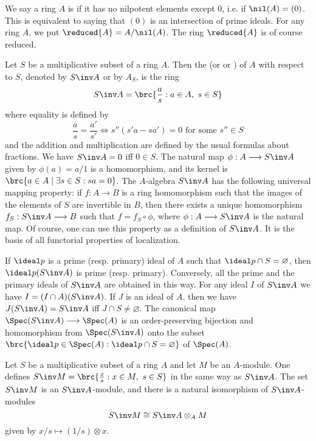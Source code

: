 \documentclass[../main]{subfiles}
\begin{document}
We say a ring $A$ is  if it has no nilpotent elements except 0, i.e. if $\nil(A)=(0)$. This is equivalent to saying that $(0)$ is an intersection of prime ideals. For any ring $A$, we put $\reduced{A}=A/\nil(A)$. The ring $\reduced{A}$ is of course reduced.

\newparagraph
Let $S$ be a multiplicative subset of a ring $A$. Then the  (or  or ) of $A$ with respect to $S$, denoted by $S\inv A$ or by $A_S$, is the ring
\[S\inv A = \brc{\frac as: a\in A,~s\in S}\]
where equality is defined by
\[\frac as = \frac{a'}{s'}
\iff s''(s'a-sa') = 0 \text{ for some }s''\in S\]
and the addition and multiplication are defined by the usual formulas about fractions. We have $S\inv A=0$ iff $0\in S$. The natural map $\phi:A\longrightarrow S\inv A$ given by $\phi(a)=a/1$ is a homomorphism, and its kernel is $\brc{a\in A\mid \exists s\in S: sa=0}$. The $A$-algebra $S\inv A$ has the following universal mapping property: if $f:A\longrightarrow B$ is a ring homomorphism such that the images of the elements of $S$ are invertible in $B$, then there exists a unique homomorphism $f_S:S\inv A\longrightarrow B$ such that $f=f_S\circ\phi$, where $\phi:A\longrightarrow S\inv A$ is the natural map. Of course, one can use this property as a definition of $S\inv A$. It is the basis of all functorial properties of localization.

If $\ideal p$ is a prime (resp. primary) ideal of $A$ such that $\ideal p\cap S=\varnothing$, then $\ideal p(S\inv A)$ is prime (resp. primary). Conversely, all the prime and the primary ideals of $S\inv A$ are obtained in this way. For any ideal $I$ of $S\inv A$ we have $I=(I\cap A)(S\inv A)$. If $J$ is an ideal of $A$, then we have $J(S\inv A)=S\inv A$ iff $J\cap S\ne\varnothing$. The canonical map $\Spec(S\inv A)\longrightarrow\Spec(A)$ is an order-preserving bijection and homomorphism from $\Spec(S\inv A)$ onto the subset $\brc{\ideal p\in\Spec(A): \ideal p\cap S=\varnothing}$ of $\Spec(A)$.

\newparagraph
Let $S$ be a multiplicative subset of a ring $A$ and let $M$ be an $A$-module. One defines $S\inv M=\brc{\frac xs:x\in M,~s\in S}$ in the same way as $S\inv A$. The set $S\inv M$ is an $S\inv A$-module, and there is a natural isomorphism of $S\inv A$-modules
\[S\inv M \cong S\inv A \otimes_A M\]
given by $x/s\mapsto(1/s)\otimes x$.
\end{document}
